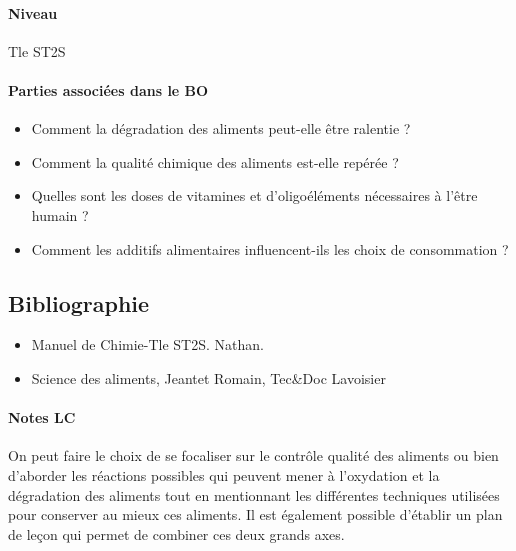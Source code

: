 \documentclass[11pt]{report}
\numberwithin{figure}{section}
\numberwithin{equation}{section}
\numberwithin{table}{section}
\newcommand{\1}{\boldsymbol{1}}
\begin{document}
\paragraph{Niveau} Tle ST2S

\paragraph{Parties associées dans le BO}
\begin{itemize}
\item Comment la dégradation des aliments peut-elle être ralentie ?
\item Comment la qualité chimique des aliments est-elle repérée ? 	
\item Quelles sont les doses de vitamines et d’oligoéléments nécessaires à l’être humain ?
\item Comment les additifs alimentaires influencent-ils les choix de consommation ?
\end{itemize}

\subsection{Bibliographie}
\begin{itemize}
\item Manuel de Chimie-Tle ST2S. Nathan.
\item Science des aliments, Jeantet Romain, Tec\&Doc Lavoisier
\end{itemize}

\paragraph{Notes LC} On peut faire le choix de se focaliser sur le contrôle qualité des aliments ou bien d’aborder les réactions possibles qui
peuvent mener à l’oxydation et la dégradation des aliments tout en mentionnant les différentes techniques utilisées
pour conserver au
mieux ces aliments.
Il est également possible d’établir un plan de leçon qui permet de combiner ces
deux grands axes.
\end{document}

